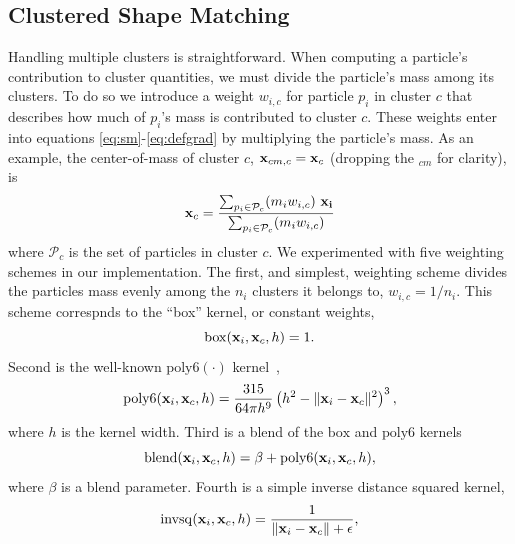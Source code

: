 \documentclass[review]{acmsiggraph}
\begin{document}
\subsection{Clustered Shape Matching}
Handling multiple clusters is straightforward.  When computing a particle's contribution to 
cluster quantities, we must divide the particle's mass among its clusters.  To do 
so we introduce a weight $w_{i,c}$ for particle $p_i$ in cluster $c$ that describes how much of
$p_i$'s mass is contributed to cluster $c$.  These weights enter into equations \eqref{eq:sm}-\eqref{eq:defgrad} by multiplying
the particle's mass.  As an example, the center-of-mass of cluster $c$, $\mathit{\mathbf{x}}_{cm,c} = \mathit{\mathbf{x}}_{c}$ (dropping the $_{cm}$ for clarity), is
\begin{equation}
\label{eq:com}
\B{x}_{c} = \frac{\sum_{p_i\in\mathcal{P}_c}(m_iw_{i,c})~\B{x_i}}{\sum_{p_i\in\mathcal{P}_c}(m_iw_{i,c})}%
\end{equation}
where $\mathcal{P}_c$ is the set of particles in cluster $c$.
We experimented with five weighting schemes in our implementation.  The first, and simplest, weighting
scheme divides the particles mass evenly among the $n_i$ clusters it belongs to, $w_{i,c} = 1/n_i$.
This scheme correspnds to the ``box'' kernel, or constant weights,
\begin{equation}
\label{eq:box}
\mathrm{box}(\mathit{\mathbf{x}}_i, \mathit{\mathbf{x}}_{c}, h) = 1.
\end{equation}
Second is the well-known $\mathrm{poly6}(\cdot)$ kernel~\cite{Mueller:2003:PFS},
\begin{equation}
\label{eq:poly6}
\mathrm{poly6}(\mathit{\mathbf{x}}_i, \mathit{\mathbf{x}}_{c}, h) = \frac{315}{64\pi h^9}\left(h^2-\|\mathit{\mathbf{x}}_i-\mathit{\mathbf{x}}_{c}\|^2\right)^3,
\end{equation}
where $h$ is the kernel width.
Third is a blend of the $\mathrm{box}$ and $\mathrm{poly6}$ kernels
\begin{equation}
\label{blend}
\mathrm{blend}(\mathit{\mathbf{x}}_i, \mathit{\mathbf{x}}_{c}, h) = \beta + \mathrm{poly6}(\mathit{\mathbf{x}}_i, \mathit{\mathbf{x}}_{c}, h),
\end{equation}
where $\beta$ is a blend parameter.
Fourth is a simple inverse distance squared kernel,
\begin{equation}
\label{eq:invdistancesquared}
\mathrm{invsq}(\mathit{\mathbf{x}}_i, \mathit{\mathbf{x}}_{c}, h) = \frac{1}{\|\mathit{\mathbf{x}}_i-\mathit{\mathbf{x}}_{c}\|+\epsilon},
\end{equation}
\end{document}
